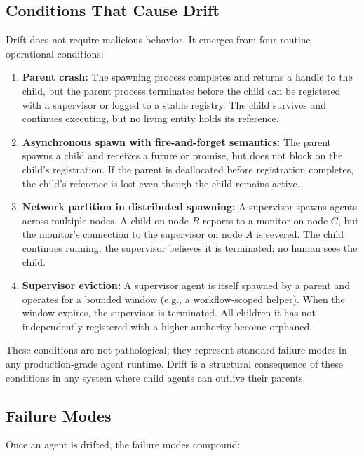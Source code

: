 \subsection{Conditions That Cause Drift}

Drift does not require malicious behavior. It emerges from four routine
operational conditions:

\begin{enumerate}
\item \textbf{Parent crash:} The spawning process completes and returns a handle
  to the child, but the parent process terminates before the child can be
  registered with a supervisor or logged to a stable registry. The child
  survives and continues executing, but no living entity holds its reference.

\item \textbf{Asynchronous spawn with fire-and-forget semantics:} The parent
  spawns a child and receives a future or promise, but does not block on the
  child's registration. If the parent is deallocated before registration
  completes, the child's reference is lost even though the child remains active.

\item \textbf{Network partition in distributed spawning:} A supervisor spawns
  agents across multiple nodes. A child on node $B$ reports to a monitor on node
  $C$, but the monitor's connection to the supervisor on node $A$ is severed. The
  child continues running; the supervisor believes it is terminated; no human
  sees the child.

\item \textbf{Supervisor eviction:} A supervisor agent is itself spawned by a
  parent and operates for a bounded window (e.g., a workflow-scoped helper). When
  the window expires, the supervisor is terminated. All children it has not
  independently registered with a higher authority become orphaned.
\end{enumerate}

These conditions are not pathological; they represent standard failure modes in
any production-grade agent runtime. Drift is a structural consequence of these
conditions in any system where child agents can outlive their parents.

\subsection{Failure Modes}

Once an agent is drifted, the failure modes compound:

